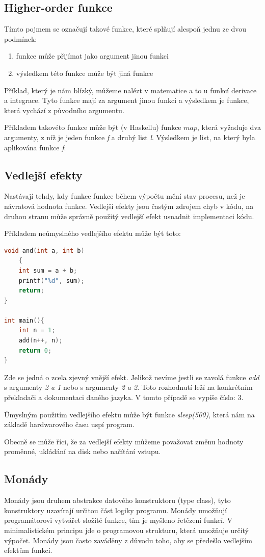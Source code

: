 \documentclass[12pt,a4paper]{report}
\begin{document}
\subsection{Higher-order funkce}
Tímto pojmem se označují takové funkce, které splňují alespoň jednu ze dvou podmínek:
\begin{enumerate}
\item funkce může přijímat jako argument jinou funkci
\item výsledkem této funkce může být jiná funkce
\end{enumerate}
Příklad, který je nám blízký, můžeme nalézt v matematice a to u funkcí derivace a integrace. Tyto funkce mají za argument jinou funkci a výsledkem je funkce, která vychází z původního argumentu.   

Příkladem takovéto funkce může být (v Haskellu) funkce $ map $, která vyžaduje dva argumenty, z níž je jeden funkce \textit{f} a druhý list \textit{l}. Výsledkem je list, na který byla aplikována funkce \textit{f}.
\newpage
\subsection{Vedlejší efekty}
Nastávají tehdy, kdy funkce funkce během výpočtu mění stav procesu, než je návratová hodnota funkce. Vedlejší efekty jsou častým zdrojem chyb v kódu, na druhou stranu může správně použitý vedlejší efekt usnadnit implementaci kódu. 

Příkladem neúmyslného vedlejšího efektu může být toto:
\begin{lstlisting}[caption={jazyk C}, captionpos=b, language = C]	
void and(int a, int b)
	{
	int sum = a + b;	
	printf("%d", sum);	
	return;
}

int main(){
	int n = 1;
	add(n++, n);	
	return 0;
}
\end{lstlisting} 
Zde se jedná o zcela zjevný vnější efekt. Jelikož nevíme jestli se zavolá funkce \textit{add} s argumenty \textit{2 a 1} nebo s argumenty \textit{2 a 2}. Toto rozhodnutí leží na konkrétním překladači a dokumentaci daného jazyka. V tomto případě se vypíše číslo: $3$. 

Úmyslným použitím vedlejšího efektu může být funkce \textit{sleep(500)}, která nám na základě hardwarového času uspí program.

Obecně se může říci, že za vedlejší efekty můžeme považovat změnu hodnoty proměnné, ukládání na disk nebo načítání vstupu.   
\subsection{Monády}
Monády jsou druhem abstrakce datového konstruktoru (type class), tyto konstruktory uzavírají určitou část logiky programu. Monády umožňují programátorovi vytvářet složité funkce, tím je myšleno řetězení funkcí. V minimalistickém principu jde o programovou strukturu, která umožňuje určitý výpočet. Monády jsou často zaváděny z důvodu toho, aby se předešlo vedlejším efektům funkcí. 
\end{document}
